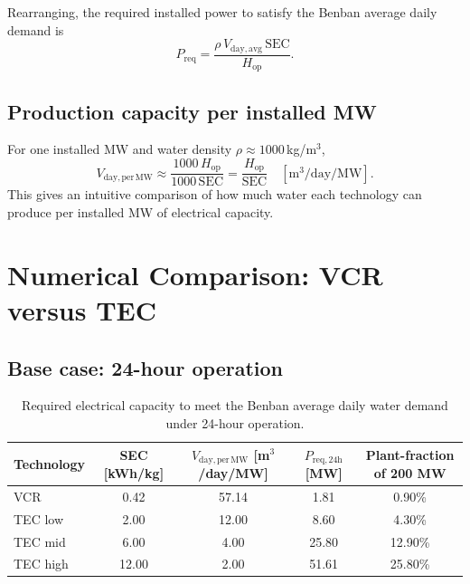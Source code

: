\documentclass[11pt,a4paper]{article}
\begin{document}
Rearranging, the required installed power to satisfy the Benban average daily demand is
\begin{equation}
P_{\mathrm{req}}=\frac{\rho\,V_{\mathrm{day,avg}}\,\mathrm{SEC}}{H_{\mathrm{op}}}.
\end{equation}

\subsection{Production capacity per installed MW}
For one installed MW and water density $\rho\approx1000$\,kg/m$^3$,
\begin{equation}
V_{\mathrm{day,per\,MW}} \approx \frac{1000\,H_{\mathrm{op}}}{1000\,\mathrm{SEC}}
=\frac{H_{\mathrm{op}}}{\mathrm{SEC}}\quad[\mathrm{m^3/day/MW}].
\end{equation}
This gives an intuitive comparison of how much water each technology can produce per installed MW of electrical capacity.

\section{Numerical Comparison: VCR versus TEC}
\subsection{Base case: 24-hour operation}
\begin{table}[h]
\centering
\caption{Required electrical capacity to meet the Benban average daily water demand under 24-hour operation.}
\begin{tabular}{@{}lcccc@{}}
\toprule
\textbf{Technology} & \textbf{SEC [kWh/kg]} & \textbf{$V_{\mathrm{day,per\,MW}}$ [m$^3$/day/MW]} & \textbf{$P_{\mathrm{req,24h}}$ [MW]} & \textbf{Plant-fraction of 200 MW} \\
\midrule
VCR & 0.42 & 57.14 & 1.81 & 0.90\% \\
TEC low & 2.00 & 12.00 & 8.60 & 4.30\% \\
TEC mid & 6.00 & 4.00 & 25.80 & 12.90\% \\
TEC high & 12.00 & 2.00 & 51.61 & 25.80\% \\
\bottomrule
\end{tabular}
\end{table}
\end{document}
